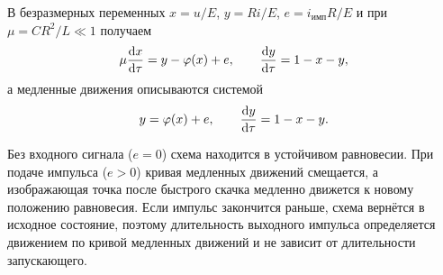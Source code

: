 В безразмерных переменных $x = u/E$, $y = Ri/E$, $e = i_\text{имп}R/E$ и при $\mu = CR^2/L \ll 1$ получаем
\begin{align} \label{eq:th:7}
	\mu\dv{x}{\tau} = y - \varphi(x) + e, \qquad \dv{y}{\tau} = 1 - x - y,
\end{align}
а медленные движения описываются системой
\begin{align} \label{eq:th:8}
	y = \varphi(x) + e, \qquad \dv{y}{\tau} = 1 - x - y.
\end{align}

Без входного сигнала ($e = 0$) схема находится в устойчивом равновесии. При подаче импульса ($e > 0$) кривая медленных движений смещается, а изображающая точка после быстрого скачка медленно движется к новому положению равновесия. Если импульс закончится раньше, схема вернётся в исходное состояние, поэтому длительность выходного импульса определяется движением по кривой медленных движений и не зависит от длительности запускающего.
